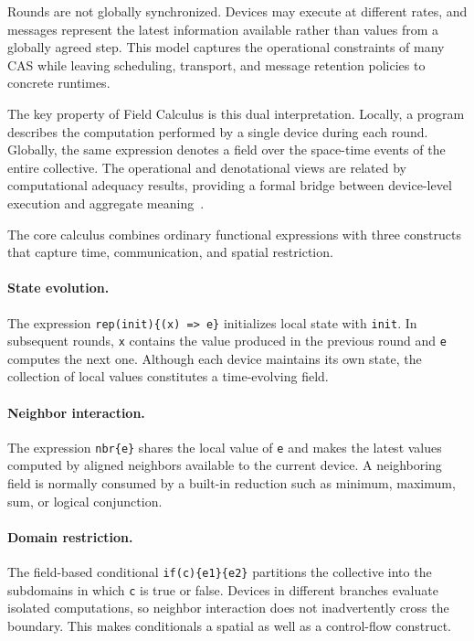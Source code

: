 Rounds are not globally synchronized. 
%
Devices may execute at different rates,
 and messages represent the latest information available rather than values 
 from a globally agreed step. 
% 
This model captures the operational constraints of many \gls{CAS} while leaving 
 scheduling, transport, and message retention policies to concrete runtimes.

The key property of Field Calculus is this dual interpretation. 
%
Locally, a program describes the computation performed 
 by a single device during each round. 
% 
Globally, 
 the same expression denotes a field over the space-time events 
 of the entire collective. 
% 
The operational and denotational views are related by computational adequacy results, 
 providing a formal bridge between device-level execution 
 and aggregate meaning~\cite{DBLP:journals/tocl/AudritoVDPB19}.

The core calculus combines ordinary functional expressions 
 with three constructs that capture time, communication, and spatial restriction.

\paragraph{State evolution.}
The expression \texttt{rep(init)\{(x) => e\}} initializes 
 local state with \texttt{init}. 
% 
In subsequent rounds, 
 \texttt{x} contains the value produced in the previous round 
 and \texttt{e} computes the next one. 
% 
Although each device maintains its own state, 
 the collection of local values constitutes a time-evolving field.

\paragraph{Neighbor interaction.}
The expression \texttt{nbr\{e\}} shares the local value of \texttt{e} 
 and makes the latest values computed by aligned neighbors available to the current device. 
% 
A neighboring field is normally consumed by a built-in reduction such as 
 minimum, maximum, sum, or logical conjunction. 

\paragraph{Domain restriction.}
The field-based conditional \texttt{if(c)\{e1\}\{e2\}} partitions 
 the collective into the subdomains in which \texttt{c} is true or false. 
% 
Devices in different branches evaluate isolated computations, 
 so neighbor interaction does not inadvertently cross the boundary. 
% 
This makes conditionals a spatial as well as a control-flow construct.

